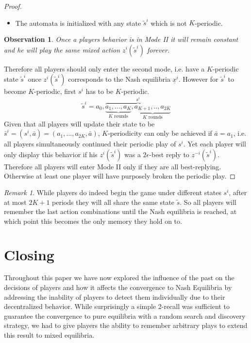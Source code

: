 \documentclass[a4paper]{article}
\theoremstyle{plain}
\newtheorem{observation}{Observation}
\theoremstyle{remark}
\newtheorem{remark}{Remark}
\begin{document}
\begin{proof}
\begin{itemize}
		\item The automata is initialized with any state $\tilde{s}^i$ which is not $K$-periodic.
	\end{itemize}
	
	\begin{observation}
		Once a players behavior is in Mode II it will remain constant and he will play the same mixed action
		$z^i(\tilde{s}^i)$ forever.
	\end{observation}
	Therefore all players should only enter the second mode, i.e. have a $K$-periodic state $\tilde{s}^i$ once $z^i(\tilde{s}^i)$
	corresponds to the Nash equilibria $\underline{x}^i$. However for $\tilde{s}^i$ to become $K$-periodic, first $s^i$ has to
	be $K$-periodic.
	\[
		\tilde{s}^i = a_{0},  \overbrace{\underbrace{a_{1},  ..., a_{K}}_{K \text{ rounds}}, \underbrace{a_{K+1}, .., a_{2K}}_{K \text{ rounds}} }^{s^i}
	\]
	Given that all players will update their state to be $\bar{s}^i = (s^i, \bar{a}) = (a_1, ..., a_{2K}, \bar{a})$,
	$K$-periodicity can only be achieved if $\bar{a} = a_1$, i.e. all players simultaneously continued their periodic play of $s^i$.
	Yet each player will only display this behavior if his $z^i(\tilde{s}^i)$ was a $2\epsilon$-best reply to $z^{-i}(\tilde{s}^i)$.
	Therefore all players will enter Mode II only if they are all best-replying. Otherwise at least one player will have
	purposely broken the periodic play.
\end{proof}

\begin{remark}
	While players do indeed begin the game under different states $s^i$, after at most $2K + 1$ periods
	they will all share the same state $\tilde{s}$. So all players will remember the last action combinations
	until the Nash equilibria is reached, at which point this becomes the only memory they hold on to.
\end{remark}

\section{Closing}

Throughout this paper we have now explored the influence of the past on the decisions of players
and how it affects the convergence to Nash Equilibria by addressing the inability of players to detect them individually
due to their decentralized behavior.
While surprisingly a simple 2-recall
was sufficient to guarantee the convergence to pure equilibria with a random search and discovery
strategy, we had to give players the ability to remember arbitrary plays to extend this result to mixed
equilibria. 
\end{document}
